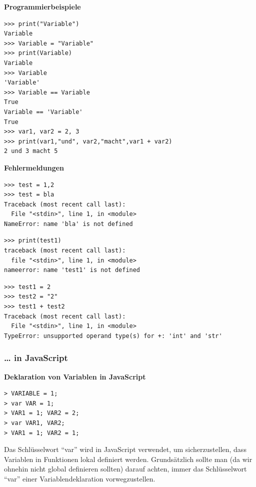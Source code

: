 \par\noindent\textbf{Programmierbeispiele}

\begin{verbatim}
>>> print("Variable")
Variable
>>> Variable = "Variable"
>>> print(Variable)
Variable
>>> Variable
'Variable'
>>> Variable == Variable
True
Variable == 'Variable'
True
>>> var1, var2 = 2, 3
>>> print(var1,"und", var2,"macht",var1 + var2)
2 und 3 macht 5
\end{verbatim}



\par\noindent\textbf{Fehlermeldungen}

\begin{verbatim}
>>> test = 1,2
>>> test = bla
Traceback (most recent call last):
  File "<stdin>", line 1, in <module>
NameError: name 'bla' is not defined
\end{verbatim}

\begin{verbatim}
>>> print(test1)
traceback (most recent call last):
  file "<stdin>", line 1, in <module>
nameerror: name 'test1' is not defined
\end{verbatim}

\begin{verbatim}
>>> test1 = 2
>>> test2 = "2"
>>> test1 + test2
Traceback (most recent call last):
  File "<stdin>", line 1, in <module>
TypeError: unsupported operand type(s) for +: 'int' and 'str'
\end{verbatim}


\subsubsection{\texorpdfstring{{\ldots{} in
JavaScript}}{\ldots{} in JavaScript}}

\par\noindent\textbf{Deklaration von Variablen in JavaScript}

\begin{verbatim}
> VARIABLE = 1;
> var VAR = 1;
> VAR1 = 1; VAR2 = 2;
> var VAR1, VAR2;
> VAR1 = 1; VAR2 = 1;
\end{verbatim}

{Das Schlüsselwort ``var'' wird in JavaScript verwendet, um
sicherzustellen, dass Variablen in Funktionen lokal definiert werden.
Grundsätzlich sollte man (da wir ohnehin nicht global definieren
sollten) darauf achten, immer das Schlüsselwort ``var'' einer
Variablendeklaration vorwegzustellen.}



